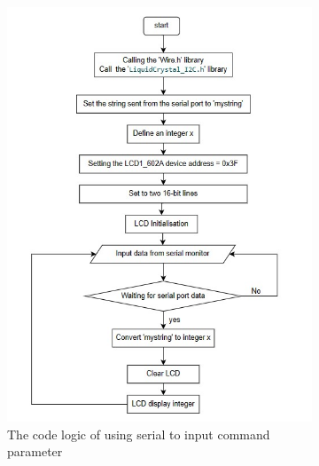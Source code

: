 \begin{figure}[H] %
    \centering 
    \captionsetup{labelsep=colon}
    \begin{subfigure}{0.45\textwidth} %
        \centering
        \includegraphics[width=\linewidth]{Image/Design/code_logic_input.jpg}
        \caption{\centering The code logic of using serial to input command parameter}
        \label{fig:cl_input}
    \end{subfigure}
    \begin{subfigure}{0.45\textwidth} %
        \centering

\end{subfigure}
\end{figure}

